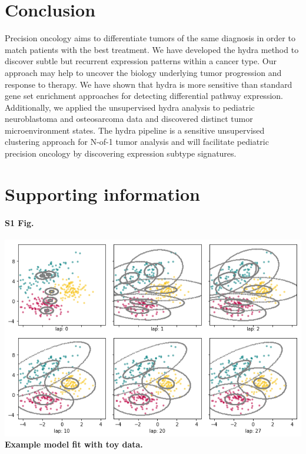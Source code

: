 \documentclass[10pt,letterpaper]{article}
\begin{document}
\section*{Conclusion}
Precision oncology aims to differentiate tumors of the same diagnosis in order to match patients with the best treatment. We have developed the hydra method to discover subtle but recurrent expression patterns within a cancer type. Our approach may help to uncover the biology underlying tumor progression and response to therapy. We have shown that hydra is more sensitive than standard gene set enrichment approaches for detecting differential pathway expression. Additionally, we applied the unsupervised hydra analysis to pediatric neuroblastoma and osteosarcoma data and discovered distinct tumor microenvironment states. The hydra pipeline is a sensitive unsupervised clustering approach for N-of-1 tumor analysis and will facilitate pediatric precision oncology by discovering expression subtype signatures.

\section*{Supporting information}

\paragraph*{S1 Fig.}
\includegraphics[width=\textwidth]{img/bnpy-example-fit}
\label{S1_Fig}
{\bf Example model fit with toy data.} 
\end{document}

